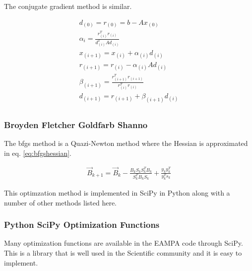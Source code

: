 The conjugate gradient method is similar.

\begin{equation}
  \begin{split}
  d_{(0)} = r_{(0)} = b - A x_{(0)} \\  
  \alpha_{i} = \frac{r^{T}_{(i)} r_{(i)}}{d^{T}_{(i)} A d_{(i)}} \\
  x_{(i+1)} = x_{(i)} + \alpha_{(i)} d_{(i)} \\
  r_{(i+1)} = r_{(i)} - \alpha_{(i)} A d_{(i)} \\
  \beta_{(i+1)} = \frac{r^{T}_{(i+1)} r_{(i+1)}} {r^{T}_{(i)} r_{(i)}} \\
  d_{(i + 1)} = r_{(i + 1)} + \beta_{(i+1)} d_{(i)}\\
  \end{split}
  \label{eq:conjugategradient}
\end{equation}


\subsubsection{Broyden Fletcher Goldfarb Shanno}

The \acrshort{bfgs} method is a Quazi-Newton method where the Hessian is approximated in eq. \ref{eq:bfgshessian}\cite{nocedalwright1}.

\begin{equation}
  \begin{split}
  \vec{B}_{k+1} = \vec{B}_{k} - \frac{B_{k}S_{k}S_{k}^{T}B_k}{S_{k}^{T} B_k S_k} + \frac{y_k y_k^T}{y_k^T s_k} 
  \end{split}
  \label{eq:bfgshessian}
\end{equation}

This optimzation method is implemented in SciPy in Python along with a number of other methods listed here.



\subsubsection{Python SciPy Optimization Functions}

Many optimization functions are available in the EAMPA code through SciPy.   This is a library that is well used in the Scientific community and it is easy to implement.


